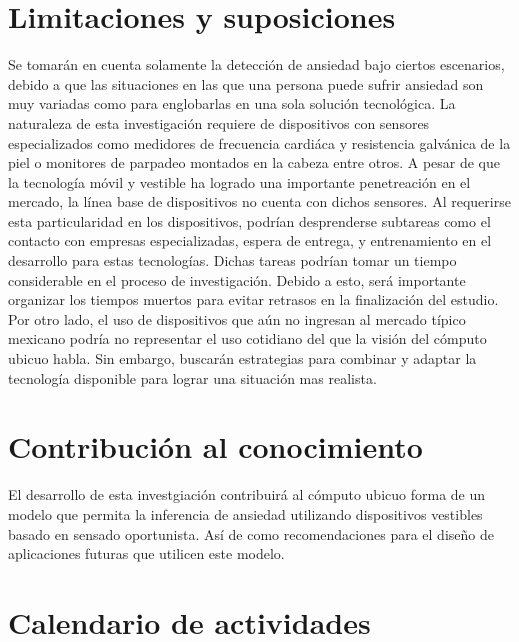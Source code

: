 \documentclass[letterpaper,12pt]{cicese}
\begin{document}
					\chapter{Limitaciones y suposiciones}
			Se tomar\'an en cuenta solamente la detecci\'on de ansiedad bajo ciertos escenarios, debido a que las situaciones en las que una persona puede sufrir ansiedad son muy variadas como para englobarlas en una sola soluci\'on tecnol\'ogica.
			La naturaleza de esta investigaci\'on requiere de dispositivos con sensores especializados como medidores de frecuencia cardi\'aca y resistencia galv\'anica de la piel o monitores de parpadeo montados en la cabeza entre otros. A pesar de que la tecnolog\'ia m\'ovil y vestible ha logrado una importante penetreaci\'on en el mercado, la l\'inea base de dispositivos no cuenta con dichos sensores. Al requerirse esta particularidad en los dispositivos, podr\'ian desprenderse subtareas como el contacto con empresas especializadas, espera de entrega, y entrenamiento en el desarrollo para estas tecnolog\'ias. Dichas tareas podr\'ian tomar un tiempo considerable en el proceso de investigaci\'on. Debido a esto, ser\'a importante organizar los tiempos muertos para evitar retrasos en la finalizaci\'on del estudio.
			Por otro lado, el uso de dispositivos que a\'un no ingresan al mercado t\'ipico mexicano podr\'ia no representar el uso cotidiano del que la visi\'on del  c\'omputo ubicuo habla. Sin embargo, buscar\'an estrategias para combinar y adaptar la tecnolog\'ia disponible para lograr una situaci\'on mas realista.
		\chapter{Contribuci\'on al conocimiento}
			El desarrollo de esta investgiaci\'on contribuir\'a al c\'omputo ubicuo forma de un modelo que permita la inferencia de ansiedad utilizando dispositivos vestibles basado en sensado oportunista. As\'i de como recomendaciones para el dise\~no de aplicaciones futuras que utilicen este modelo.
		\chapter{Calendario de actividades}
	\newpage
	\addcontentsline{toc}{chapter}{\normalsize\expandafter{Referencias}}
	{\normalsize
		
		
	}
	
\end{document}
